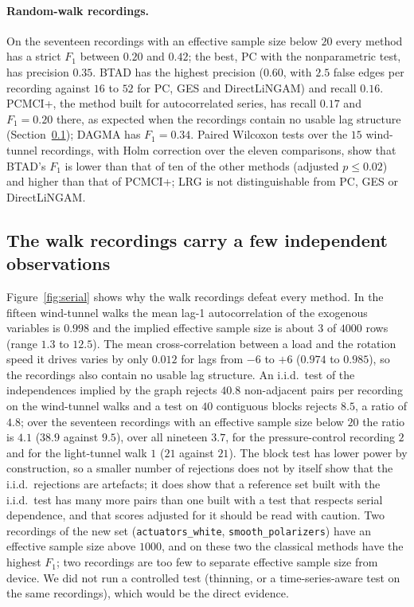 \paragraph{Random-walk recordings.} On the seventeen recordings with an effective sample size
below $20$ every method has a strict $F_1$ between $0.20$ and $0.42$; the best, PC with the nonparametric test,
has precision $0.35$. BTAD has the highest precision ($0.60$, with $2.5$ false edges per
recording against $16$ to $52$ for PC, GES and DirectLiNGAM) and recall $0.16$. PCMCI+, the method
built for autocorrelated series, has recall $0.17$ and $F_1=0.20$ there, as expected when the
recordings contain no usable lag structure (Section~\ref{sec:serial}); DAGMA has $F_1=0.34$. Paired Wilcoxon tests over the $15$
wind-tunnel recordings, with Holm correction over the eleven comparisons, show that BTAD's $F_1$ is
lower than that of ten of the other methods (adjusted $p\le0.02$) and higher than that of PCMCI+; LRG is not
distinguishable from PC, GES or DirectLiNGAM.

\subsection{The walk recordings carry a few independent observations}\label{sec:serial}

Figure~\ref{fig:serial} shows why the walk recordings defeat every method. In the fifteen
wind-tunnel walks the mean lag-1 autocorrelation of the exogenous variables is $0.998$ and
the implied effective sample size is about $3$ of $4000$ rows (range $1.3$ to $12.5$). The mean
cross-correlation between a load and the rotation speed it drives varies by only $0.012$ for lags from $-6$
to $+6$ ($0.974$ to $0.985$), so the recordings also contain no usable lag structure. An i.i.d.\ test
of the independences implied by the graph rejects $40.8$ non-adjacent pairs per recording on the wind-tunnel
walks and a test on $40$ contiguous blocks rejects $8.5$, a ratio of $4.8$; over the seventeen recordings with an
effective sample size below $20$ the ratio is $4.1$ ($38.9$ against $9.5$), over all nineteen $3.7$, for
the pressure-control recording $2$ and for the light-tunnel walk $1$ ($21$ against $21$). The block
test has lower power by construction, so a smaller number of rejections does not by itself show that the
i.i.d.\ rejections are artefacts; it does show that a reference set built with the i.i.d.\ test has
many more pairs than one built with a test that respects serial dependence, and that scores adjusted
for it should be read with caution. Two
recordings of the new set (\texttt{actuators\_white}, \texttt{smooth\_polarizers}) have an
effective sample size above $1000$, and on these two the classical methods have the highest $F_1$; two
recordings are too few to separate effective sample size from device. We did not run a controlled test
(thinning, or a time-series-aware test on the same recordings), which would be the direct evidence.

